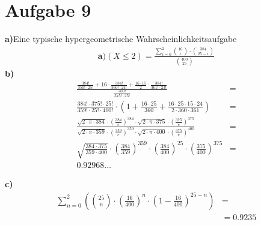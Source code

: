 \documentclass{article}
\begin{document}
\section*{Aufgabe 9}

\textbf{a)}Eine typische hypergeometrische Wahrscheinlichkeitsaufgabe
\begin{align*}
\textbf{a)}
(X\leq2) = \frac{\sum_{i=0}^{2}\binom{16}{i}\cdot\binom{384}{25-i}}{\binom{400}{25}} 
\end{align*}
\textbf{b)}
\begin{align} 
\frac{\frac{384!}{359!\cdot25!}+16\cdot\frac{384!}{360!\cdot24!}+\frac{16\cdot15}{2}\cdot\frac{384!}{361!\cdot23!}}{\frac{400!}{375!\cdot25!}} &=\\
\frac{384!\cdot375!\cdot25!}{359!\cdot25!\cdot400!} \cdot (1 + \frac{16\cdot25}{360} + \frac{16\cdot25\cdot15\cdot24}{2\cdot360\cdot361}) &=\\
\frac{\sqrt{2\cdot\pi\cdot384}\cdot(\frac{384}{e})^{384}\cdot\sqrt{2\cdot\pi\cdot375}\cdot(\frac{375}{e})^{375}}
	{{\sqrt{2\cdot\pi\cdot359}\cdot(\frac{359}{e})^{359}\cdot\sqrt{2\cdot\pi\cdot400}\cdot(\frac{375}{e})^{400}}} &=\\
\sqrt{\frac{384\cdot375}{359\cdot400}}\cdot(\frac{384}{359})^{359}\cdot(\frac{384}{400})^{25}\cdot(\frac{375}{400})^{375} &=\\
0.92968\dots
\end{align}

\textbf{c)}
\begin{align*} 
\sum_{n=0}^{2} (\binom{25}{n} \cdot (\frac{16}{400})^{n}\cdot (1-\frac{16}{400})^{25-n}) &= \\
&= 0.9235
\end{align*}
\end{document}
